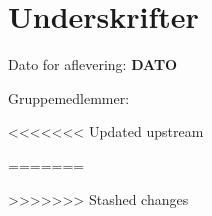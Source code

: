 \chapter*{Underskrifter}

Dato for aflevering: \textbf{DATO}

Gruppemedlemmer:
\vspace{2cm}

<<<<<<< Updated upstream
\signature{201270727 - Anders Bæk Møller (ABM)}
\signature{201270432 - Bjørn Sørensen (BS)}
\signature{201270478 - Jesper Christensen (JC)}
\signature{201271288 - Lasse Beck Thostrup (LT)}
\signature{201370744 - Lars Harup Holm (LHH)}
\signature{201371016 - Loc Dai Le (LL)}
\signature{201371180 - Michael Toft Jensen (MJ)}
=======
\signature{Anders Bæk Møller (ABM)}
\signature{Bjørn Sørensen (BS) 201270432}
\signature{Jesper Christensen (JC) 201270478}
\signature{Lasse Beck Thostrup (LT)}
\signature{Lars Harup Holm (LHH)}
\signature{Loc Dai Le (LL) 201371016}
\signature{Michael Toft Jensen (MJ)}
>>>>>>> Stashed changes
\vspace{2cm}
\signature{Vejleder: Frank Bodholdt Jakobsen}
